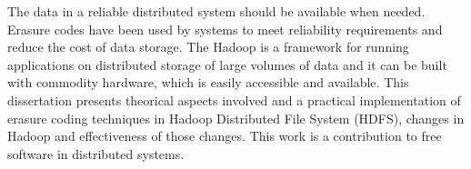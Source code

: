   The data in a reliable distributed system should be available when
  needed. Erasure codes have been used by systems to meet reliability
  requirements and reduce the cost of data storage. The Hadoop is a
  framework for running applications on distributed storage of large
  volumes of data and it can be built with commodity hardware, which
  is easily accessible and available. This dissertation presents theorical
  aspects involved and a practical implementation of erasure coding techniques
  in Hadoop Distributed File System (HDFS), changes in Hadoop and
  effectiveness of those changes. This work is a contribution to
  free software in distributed systems.
